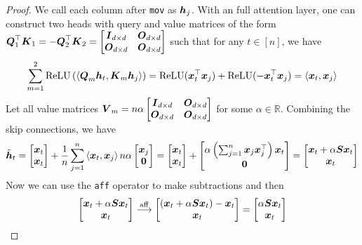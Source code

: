 \begin{proof}
We call each column after \verb|mov| as $\boldsymbol{h}_j$. With an full attention layer, one can construct two heads with query and value matrices of the form $\boldsymbol{Q}_1^\top \boldsymbol{K}_1 = -\boldsymbol{Q}_2^\top \boldsymbol{K}_2 = \begin{bmatrix}
    \boldsymbol{I}_{d \times d} & \boldsymbol{O}_{d \times d} \\
    \boldsymbol{O}_{d \times d} & \boldsymbol{O}_{d \times d}
\end{bmatrix}$ such that for any $t \in [n]$, we have 
\begin{equation}
    \sum_{m=1}^2 \mathrm{ReLU} \left(\left\langle {\boldsymbol{Q}_m \boldsymbol{h}_t, \boldsymbol{K}_m \boldsymbol{h}_j} \right\rangle\right) = \mathrm{ReLU}(\boldsymbol{x}_t^\top \boldsymbol{x}_j) +  \mathrm{ReLU}(-\boldsymbol{x}_t^\top \boldsymbol{x}_j) = \left\langle {\boldsymbol{x}_t, \boldsymbol{x}_j} \right\rangle
\end{equation}
Let all value matrices $\boldsymbol{V}_m =n \alpha \begin{bmatrix}
    \boldsymbol{I}_{d \times d} & \boldsymbol{O}_{d \times d} \\
    \boldsymbol{O}_{d \times d} & \boldsymbol{O}_{d \times d}
\end{bmatrix}$ for some $\alpha \in \mathbb R$. Combining the skip connections, we have 
\begin{equation}
    \tilde{\boldsymbol{h}}_t = \begin{bmatrix}
        \boldsymbol{x}_t \\ \boldsymbol{x}_t
    \end{bmatrix} + \frac{1}{n} \sum_{j=1}^n \left\langle {\boldsymbol{x}_t, \boldsymbol{x}_j} \right\rangle n \alpha \begin{bmatrix}
        \boldsymbol{x}_j \\ \boldsymbol{0} 
    \end{bmatrix}  = \begin{bmatrix}
        \boldsymbol{x}_t \\ \boldsymbol{x}_t
    \end{bmatrix} + \begin{bmatrix}
       \alpha \left(\sum_{j=1}^n \boldsymbol{x}_j \boldsymbol{x}_j^\top \right) \boldsymbol{x}_t \\ \boldsymbol{0}
    \end{bmatrix} = \begin{bmatrix}
        \boldsymbol{x}_t + \alpha \boldsymbol{S} \boldsymbol{x}_t \\ \boldsymbol{x}_t
    \end{bmatrix} 
\end{equation}
Now we can use the \verb|aff| operator to make subtractions and then
\begin{equation}
    \begin{bmatrix}
        \boldsymbol{x}_t + \alpha \boldsymbol{S} \boldsymbol{x}_t \\ \boldsymbol{x}_t
    \end{bmatrix}  \overset{\mathrm{aff}}{\longrightarrow}\begin{bmatrix}
        (\boldsymbol{x}_t + \alpha \boldsymbol{S} \boldsymbol{x}_t) - \boldsymbol{x}_t  \\ \boldsymbol{x}_t
    \end{bmatrix}  = \begin{bmatrix}
         \alpha \boldsymbol{S} \boldsymbol{x}_t \\ \boldsymbol{x}_t
    \end{bmatrix}
\end{equation}


\end{proof}
